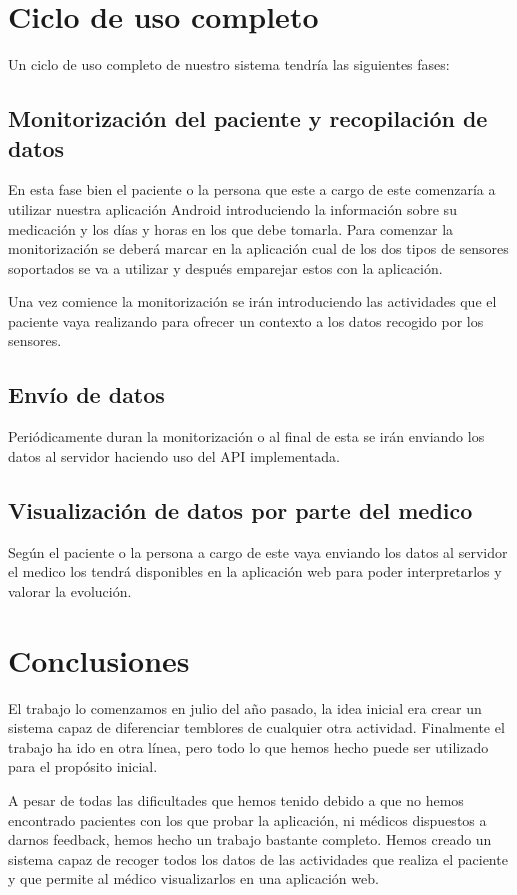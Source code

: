 \documentclass[11pt,spanish]{article}
\begin{document}
\section{Ciclo de uso completo}
Un ciclo de uso completo de nuestro sistema tendría las siguientes fases:

\subsection{Monitorización del paciente y recopilación de datos}
En esta fase bien el paciente o la persona que este a cargo de este comenzaría a utilizar nuestra aplicación Android introduciendo la información sobre su medicación y los días y horas en los que debe tomarla. Para comenzar la monitorización se deberá marcar en la aplicación cual de los dos tipos de sensores soportados se va a utilizar y después emparejar estos con la aplicación. 

Una vez comience la monitorización se irán introduciendo las actividades que el paciente vaya realizando para ofrecer un contexto a los datos recogido por los sensores.

\subsection{Envío de datos}
Periódicamente duran la monitorización o al final de esta se irán enviando los datos al servidor haciendo uso del API implementada.

\subsection{Visualización de datos por parte del medico}
Según el paciente o la persona a cargo de este vaya enviando los datos al servidor el medico los tendrá disponibles en la aplicación web para poder interpretarlos y valorar la evolución.
\newpage

\section{Conclusiones}
El trabajo lo comenzamos en julio del año pasado, la idea inicial era crear un sistema capaz de diferenciar temblores de cualquier otra actividad. Finalmente el trabajo ha ido en otra línea, pero todo lo que hemos hecho puede ser utilizado para el propósito inicial.
\newline

A pesar de todas las dificultades que hemos tenido debido a que no hemos encontrado pacientes con los que probar la aplicación, ni médicos dispuestos a darnos feedback, hemos hecho un trabajo bastante completo. Hemos creado un sistema capaz de recoger todos los datos de las actividades que realiza el paciente y que permite al médico visualizarlos en una aplicación web.
\newline
\end{document}
